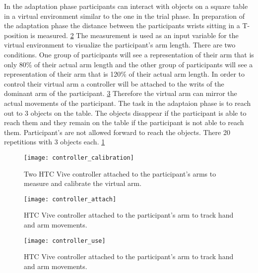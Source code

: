 In the adaptation phase participants can interact with objects on a square table in a virtual environment similar to the one in the trial phase. In preparation of the adaptation phase the distance between the participants wrists sitting in a T-position is measured. \ref{fig:controller_calibration} The measurement is used as an input variable for the virtual environment to visualize the participant's arm length. There are two conditions. One group of participants will see a representation of their arm that is only 80\% of their actual arm length and the other group of participants will see a representation of their arm that is 120\% of their actual arm length. In order to control their virtual arm a controller will be attached to the writs of the dominant arm of the participant. \ref{fig:controller_attach} Therefore the virtual arm can mirror the actual movements of the participant. The task in the adaptaion phase is to reach out to 3 objects on the table. The objects disappear if the participant is able to reach them and they remain on the table if the participant is not able to reach them. Participant's are not allowed forward to reach the objects. There 20 repetitions with 3 objects each. \ref{fig:controller_use}

\begin{figure}[h]
\centering
\texttt{[image: controller\_calibration]}
\caption{Two HTC Vive controller attached to the participant's arms to measure and calibrate the virtual arm.}
\label{fig:controller_use}
\end{figure}

\begin{figure}[h]
\centering
\texttt{[image: controller\_attach]}
\caption{HTC Vive controller attached to the participant's arm to track hand and arm movements.}
\label{fig:controller_calibration}
\end{figure}

\begin{figure}
\centering
  \texttt{[image: controller\_use]}
  \caption{HTC Vive controller attached to the participant's arm to track hand and arm movements.}
  \label{fig:controller_attach}
\end{figure}




